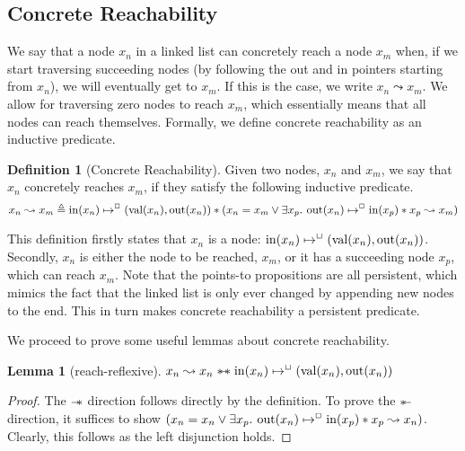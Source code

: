 \documentclass[a4paper, 10pt]{report}
\theoremstyle{definition}
\newtheorem{lemma}[theorem]{Lemma}
\newtheorem{definition}{Definition}[section]
\newcommand{\nIn}[1]{\operatorname{in}(#1)}
\newcommand{\nVal}[1]{\operatorname{val}(#1)}
\newcommand{\nOut}[1]{\operatorname{out}(#1)}
\newcommand{\node}{x}
\newcommand{\nodeM}[1]{\node_{#1}}
\newcommand{\isNode}[1]{\nIn{#1} \mapsto^{\persistently} (\nVal{#1}, \nOut{#1})}
\newcommand{\reach}[2]{#1 \leadsto #2}
\begin{document}
\subsection{Concrete Reachability}
We say that a node $\nodeM{n}$ in a linked list can concretely reach a node $\nodeM{m}$ when, if we start traversing succeeding nodes (by following the out and in pointers starting from $\nodeM{n}$), we will eventually get to $\nodeM{m}$. If this is the case, we write $\reach{\nodeM{n}}{\nodeM{m}}$. We allow for traversing zero nodes to reach $\nodeM{m}$, which essentially means that all nodes can reach themselves. Formally, we define concrete reachability as an inductive predicate.
\begin{definition}[Concrete Reachability]
  Given two nodes, $\nodeM{n}$ and $\nodeM{m}$, we say that $\nodeM{n}$ concretely reaches $\nodeM{m}$, if they satisfy the following inductive predicate.
  \begin{equation*}
    \reach{\nodeM{n}}{\nodeM{m}} \eqdef \isNode{\nodeM{n}} \star{} (\nodeM{n} = \nodeM{m} \lor{} \Exists \nodeM{p} . \nOut{\nodeM{n}} \mapsto^{\persistently} \nIn{\nodeM{p}} \star{} \reach{\nodeM{p}}{\nodeM{m}})
  \end{equation*}
\end{definition}
This definition firstly states that $\nodeM{n}$ is a node: $\isNode{\nodeM{n}}$. Secondly, $\nodeM{n}$ is either the node to be reached, $\nodeM{m}$, or it has a succeeding node $\nodeM{p}$, which can reach $\nodeM{m}$.
Note that the points-to propositions are all persistent, which mimics the fact that the linked list is only ever changed by appending new nodes to the end. This in turn makes concrete reachability a persistent predicate.

We proceed to prove some useful lemmas about concrete reachability.
\begin{lemma}[reach-reflexive]\label{lemma:reach-reflexive}
  $\reach{\nodeM{n}}{\nodeM{n}} \wandIff \isNode{\nodeM{n}}$
\end{lemma}
\begin{proof}
  The $\mathrel{-\!\!*}$ direction follows directly by the definition. To prove the $\mathrel{*\!\!-}$ direction, it suffices to show $(\nodeM{n} = \nodeM{n} \lor{} \Exists \nodeM{p} . \nOut{\nodeM{n}} \mapsto^{\persistently} \nIn{\nodeM{p}} \star{} \reach{\nodeM{p}}{\nodeM{n}})$. Clearly, this follows as the left disjunction holds.
\end{proof}
\end{document}
